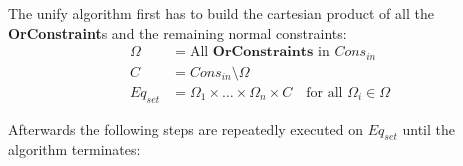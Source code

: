 The unify algorithm first has to build the cartesian product of all the \textbf{OrConstraint}s and the remaining normal constraints:
\begin{align*}
\Omega &= \text{All }\mathbf{OrConstraints} \text{ in } {Cons}_{in}\\
C &= {Cons}_{in} \setminus \Omega \\
Eq_{set} &= \Omega_1 \times \ldots \times \Omega_n \times C \quad \text{for all }\Omega_i \in \Omega
\end{align*}

Afterwards the following steps are repeatedly executed on $Eq_{set}$ until the algorithm terminates:

